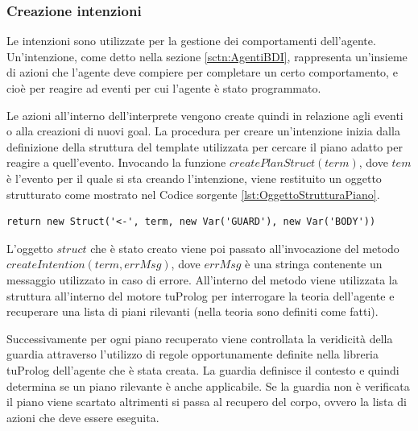 \subsubsection{Creazione intenzioni}
Le intenzioni sono utilizzate per la gestione dei comportamenti dell'agente. Un'intenzione, come detto nella sezione \ref{sctn:AgentiBDI}, rappresenta un'insieme di azioni che l'agente deve compiere per completare un certo comportamento, e cioè per reagire ad eventi per cui l'agente è stato programmato.

Le azioni all'interno dell'interprete vengono create quindi in relazione agli eventi o alla creazioni di nuovi goal.
La procedura per creare un'intenzione inizia dalla definizione della struttura del template utilizzata per cercare il piano adatto per reagire a quell'evento. Invocando la funzione $createPlanStruct(term)$, dove $tem$ è l'evento per il quale si sta creando l'intenzione, viene restituito un oggetto strutturato come mostrato nel Codice sorgente \ref{lst:OggettoStrutturaPiano}.
\medskip
\begin{lstlisting}[float,firstnumber=1,label={lst:OggettoStrutturaPiano},caption={Oggetto che definisce la struttura del piano}]
return new Struct('<-', term, new Var('GUARD'), new Var('BODY'))
\end{lstlisting}

L'oggetto $struct$ che è stato creato viene poi passato all'invocazione del metodo $createIntention(term, errMsg)$, dove $errMsg$ è una stringa contenente un messaggio utilizzato in caso di errore.
All'interno del metodo viene utilizzata la struttura all'interno del motore tuProlog per interrogare la teoria dell'agente e recuperare una lista di piani rilevanti (nella teoria sono definiti come fatti). 

Successivamente per ogni piano recuperato viene controllata la veridicità della guardia attraverso l'utilizzo di regole opportunamente definite nella libreria tuProlog dell'agente che è stata creata. La guardia definisce il contesto e quindi determina se un piano rilevante è anche applicabile.
Se la guardia non è verificata il piano viene scartato altrimenti si passa al recupero del corpo, ovvero la lista di azioni che deve essere eseguita.

